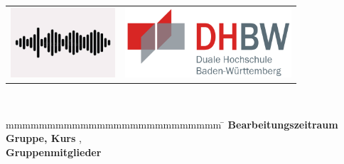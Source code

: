 
\begin{titlepage}
	\begin{longtable}{p{} p{}}
	  {\includegraphics[height=2.6cm]{images/logo.png}} & 
	  {\includegraphics[height=2.6cm]{images/dhbw.png}}
	\end{longtable}
	\enlargethispage{20mm}
	\begin{center}
	  \vspace*{12mm}	{\LARGE\bf \titel }\\
	\end{center}
	\vfill
	\begin{spacing}{1.2}
	\begin{tabbing}
		mmmmmmmmmmmmmmmmmmmmmmmmmm     \= \kill
		\textbf{Bearbeitungszeitraum}  \>  \zeitraum\\
		\textbf{Gruppe, Kurs}  \>  \martrikelnr, \kurs\\
		\textbf{Gruppenmitglieder}      \>  \firma\\
		\textbf{}              \>  \betreuer\\
	\end{tabbing}
	\end{spacing}
\end{titlepage}
